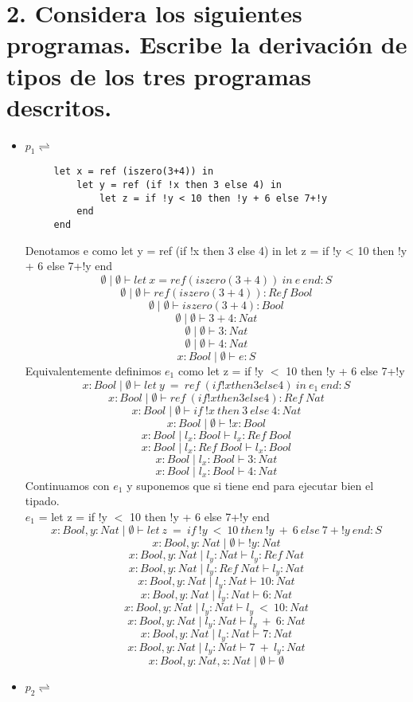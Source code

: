 \documentclass[11pt, a4paper]{report}
\begin{document}
\section*{2. Considera los siguientes programas. Escribe la derivación de tipos de los tres programas descritos.}
\begin{itemize}
	\item $p_{1} \rightleftharpoons$
		\begin{lstlisting}
     let x = ref (iszero(3+4)) in
	     let y = ref (if !x then 3 else 4) in
		     let z = if !y < 10 then !y + 6 else 7+!y
	     end
     end
		\end{lstlisting}
		Denotamos e como let y = ref (if !x then 3 else 4) in let z = if !y < 10 then !y + 6 else 7+!y end
		$$ \emptyset \mid \emptyset \vdash let\ x=ref(iszero(3+4))\ in\ e\ end:S $$
		$$ \emptyset \mid \emptyset \vdash ref(iszero(3+4)):Ref\ Bool $$
		$$ \emptyset \mid \emptyset \vdash iszero(3+4):Bool $$
		$$ \emptyset \mid \emptyset \vdash 3+4:Nat $$
		$$ \emptyset \mid \emptyset \vdash 3:Nat $$
		$$ \emptyset \mid \emptyset \vdash 4:Nat $$		
		$$ x:Bool\mid \emptyset \vdash e:S $$
		Equivalentemente definimos $e_{1}$ como let z = if !y $<$ 10 then !y + 6 else 7+!y
		$$ x:Bool\mid \emptyset \vdash let\ y\ =\ ref\ (if !x then 3 else 4)\ in\ e_{1}\ end:S$$
		$$ x:Bool\mid \emptyset \vdash ref\ (if !x then 3 else 4):Ref\ Nat $$
		$$ x:Bool\mid \emptyset \vdash if\ !x\ then\ 3\ else\ 4:Nat $$
		$$ x:Bool\mid \emptyset \vdash !x:Bool $$
		$$ x:Bool\mid l_{x}:Bool \vdash l_{x}:Ref\ Bool$$
		$$ x:Bool\mid l_{x}:Ref\ Bool \vdash l_{x}:Bool$$
		$$ x:Bool\mid l_{x}:Bool \vdash 3:Nat $$
		$$ x:Bool\mid l_{x}:Bool \vdash 4:Nat$$
		Continuamos con $e_{1}$ y suponemos que si tiene end para ejecutar bien el tipado.\\
		$e_{1}$ = let z = if !y $<$ 10 then !y + 6 else 7+!y end
		$$ x:Bool,y:Nat\mid \emptyset \vdash let\ z\ =\ if\ !y\ <\ 10\ then\ !y\ +\ 6\ else\ 7+!y\ end:S $$
		$$ x:Bool,y:Nat\mid \emptyset \vdash !y:Nat $$
		$$ x:Bool,y:Nat\mid l_{y}:Nat \vdash l_{y}:Ref\ Nat$$
		$$ x:Bool,y:Nat\mid l_{y}:Ref\ Nat \vdash l_{y}:Nat $$
		$$ x:Bool,y:Nat\mid l_{y}:Nat \vdash 10:Nat $$
		$$ x:Bool,y:Nat\mid l_{y}:Nat \vdash 6:Nat $$
		$$ x:Bool,y:Nat\mid l_{y}:Nat \vdash l_{y}\ <\ 10:Nat $$		
		$$ x:Bool,y:Nat\mid l_{y}:Nat \vdash l_{y}\ +\ 6:Nat$$
		$$ x:Bool,y:Nat\mid l_{y}:Nat \vdash 7:Nat $$
		$$ x:Bool,y:Nat\mid l_{y}:Nat \vdash 7\ +\ l_{y}:Nat $$
		$$ x:Bool,y:Nat,z:Nat\mid \emptyset \vdash \emptyset $$
	\item $p_{2} \rightleftharpoons$

\end{itemize}
\end{document}
